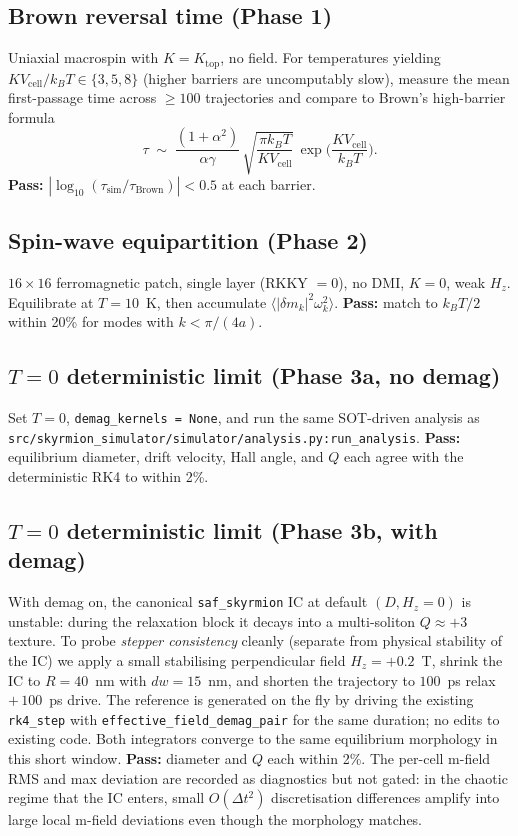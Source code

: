 \documentclass[11pt,a4paper]{article}
\newcommand{\Vcell}{V_{\text{cell}}}
\newcommand{\kB}{k_B}
\begin{document}
\subsection{Brown reversal time (Phase 1)}

Uniaxial macrospin with $K = K_{\text{top}}$, no field. For
temperatures yielding $K\Vcell/\kB T \in \{3, 5, 8\}$ (higher
barriers are uncomputably slow), measure the mean first-passage time
across $\geq 100$ trajectories and compare to Brown's high-barrier
formula
%
\begin{equation}
\tau \;\sim\; \frac{(1+\alpha^2)}{\alpha\gamma}\,
\sqrt{\frac{\pi \kB T}{K \Vcell}}\,
\exp\!\Big(\frac{K \Vcell}{\kB T}\Big).
\end{equation}
%
\textbf{Pass:} $|\log_{10}(\tau_{\text{sim}} / \tau_{\text{Brown}})|
< 0.5$ at each barrier.

\subsection{Spin-wave equipartition (Phase 2)}

$16 \times 16$ ferromagnetic patch, single layer (RKKY $= 0$), no
DMI, $K = 0$, weak $H_z$. Equilibrate at $T = 10$~K, then accumulate
$\langle |\delta m_k|^2 \omega_k^2 \rangle$. \textbf{Pass:} match to
$\kB T / 2$ within 20\% for modes with $k < \pi/(4a)$.

\subsection{$T=0$ deterministic limit (Phase 3a, no demag)}

Set $T = 0$, \texttt{demag\_kernels = None}, and run the same
SOT-driven analysis as \texttt{src/skyrmion\_simulator/simulator/analysis.py:run\_analysis}.
\textbf{Pass:} equilibrium diameter, drift velocity, Hall angle, and
$Q$ each agree with the deterministic RK4 to within 2\%.

\subsection{$T=0$ deterministic limit (Phase 3b, with demag)}

With demag on, the canonical \texttt{saf\_skyrmion} IC at default
$(D, H_z = 0)$ is unstable: during the relaxation block it decays
into a multi-soliton $Q \approx +3$ texture. To probe \emph{stepper
consistency} cleanly (separate from physical stability of the IC)
we apply a small stabilising perpendicular field $H_z = +0.2$~T,
shrink the IC to $R = 40$~nm with $dw = 15$~nm, and shorten the
trajectory to $100$~ps relax $+\,100$~ps drive. The reference is
generated on the fly by driving the existing \texttt{rk4\_step}
with \texttt{effective\_field\_demag\_pair} for the same duration;
no edits to existing code. Both integrators converge to the same
equilibrium morphology in this short window. \textbf{Pass:}
diameter and $Q$ each within 2\%. The per-cell m-field RMS and max
deviation are recorded as diagnostics but not gated: in the
chaotic regime that the IC enters, small $O(\Delta t^2)$
discretisation differences amplify into large local m-field
deviations even though the morphology matches.
\end{document}
